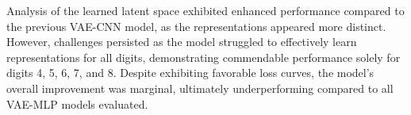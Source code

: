 \documentclass[12pt]{article}
\begin{document}
Analysis of the learned latent space exhibited enhanced performance compared to the previous VAE-CNN model, as the representations appeared more distinct. However, challenges persisted as the model struggled to effectively learn representations for all digits, demonstrating commendable performance solely for digits 4, 5, 6, 7, and 8. Despite exhibiting favorable loss curves, the model's overall improvement was marginal, ultimately underperforming compared to all VAE-MLP models evaluated.











\end{document}

